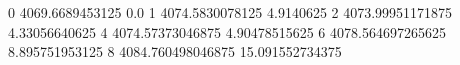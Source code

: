 0 4069.6689453125 0.0
1 4074.5830078125 4.9140625
2 4073.99951171875 4.33056640625
4 4074.57373046875 4.90478515625
6 4078.564697265625 8.895751953125
8 4084.760498046875 15.091552734375

